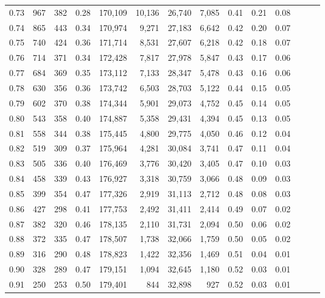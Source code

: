 \begin{tabular}{rrrrrrrrrrrrrr}
0.73 &    967 &  382 &  0.28 &  170,109 &   10,136 &  26,740 &   7,085 &  0.41 &  0.21 &      0.08 \\
0.74 &    865 &  443 &  0.34 &  170,974 &    9,271 &  27,183 &   6,642 &  0.42 &  0.20 &      0.07 \\
0.75 &    740 &  424 &  0.36 &  171,714 &    8,531 &  27,607 &   6,218 &  0.42 &  0.18 &      0.07 \\
0.76 &    714 &  371 &  0.34 &  172,428 &    7,817 &  27,978 &   5,847 &  0.43 &  0.17 &      0.06 \\
0.77 &    684 &  369 &  0.35 &  173,112 &    7,133 &  28,347 &   5,478 &  0.43 &  0.16 &      0.06 \\
0.78 &    630 &  356 &  0.36 &  173,742 &    6,503 &  28,703 &   5,122 &  0.44 &  0.15 &      0.05 \\
0.79 &    602 &  370 &  0.38 &  174,344 &    5,901 &  29,073 &   4,752 &  0.45 &  0.14 &      0.05 \\
0.80 &    543 &  358 &  0.40 &  174,887 &    5,358 &  29,431 &   4,394 &  0.45 &  0.13 &      0.05 \\
0.81 &    558 &  344 &  0.38 &  175,445 &    4,800 &  29,775 &   4,050 &  0.46 &  0.12 &      0.04 \\
0.82 &    519 &  309 &  0.37 &  175,964 &    4,281 &  30,084 &   3,741 &  0.47 &  0.11 &      0.04 \\
0.83 &    505 &  336 &  0.40 &  176,469 &    3,776 &  30,420 &   3,405 &  0.47 &  0.10 &      0.03 \\
0.84 &    458 &  339 &  0.43 &  176,927 &    3,318 &  30,759 &   3,066 &  0.48 &  0.09 &      0.03 \\
0.85 &    399 &  354 &  0.47 &  177,326 &    2,919 &  31,113 &   2,712 &  0.48 &  0.08 &      0.03 \\
0.86 &    427 &  298 &  0.41 &  177,753 &    2,492 &  31,411 &   2,414 &  0.49 &  0.07 &      0.02 \\
0.87 &    382 &  320 &  0.46 &  178,135 &    2,110 &  31,731 &   2,094 &  0.50 &  0.06 &      0.02 \\
0.88 &    372 &  335 &  0.47 &  178,507 &    1,738 &  32,066 &   1,759 &  0.50 &  0.05 &      0.02 \\
0.89 &    316 &  290 &  0.48 &  178,823 &    1,422 &  32,356 &   1,469 &  0.51 &  0.04 &      0.01 \\
0.90 &    328 &  289 &  0.47 &  179,151 &    1,094 &  32,645 &   1,180 &  0.52 &  0.03 &      0.01 \\
0.91 &    250 &  253 &  0.50 &  179,401 &      844 &  32,898 &     927 &  0.52 &  0.03 &      0.01 \\

\end{tabular}
